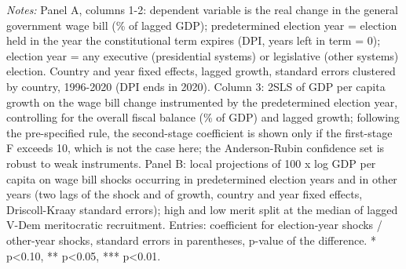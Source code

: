 \begin{table}[htbp]
\begin{minipage}{0.95\linewidth}\vspace{4pt}\scriptsize \textit{Notes:} Panel A, columns 1-2: dependent variable is the real change in the general government wage bill (\% of lagged GDP); predetermined election year = election held in the year the constitutional term expires (DPI, years left in term = 0); election year = any executive (presidential systems) or legislative (other systems) election. Country and year fixed effects, lagged growth, standard errors clustered by country, 1996-2020 (DPI ends in 2020). Column 3: 2SLS of GDP per capita growth on the wage bill change instrumented by the predetermined election year, controlling for the overall fiscal balance (\% of GDP) and lagged growth; following the pre-specified rule, the second-stage coefficient is shown only if the first-stage F exceeds 10, which is not the case here; the Anderson-Rubin confidence set is robust to weak instruments. Panel B: local projections of 100 x log GDP per capita on wage bill shocks occurring in predetermined election years and in other years (two lags of the shock and of growth, country and year fixed effects, Driscoll-Kraay standard errors); high and low merit split at the median of lagged V-Dem meritocratic recruitment. Entries: coefficient for election-year shocks / other-year shocks, standard errors in parentheses, p-value of the difference. * p<0.10, ** p<0.05, *** p<0.01.\end{minipage}
\end{table}
